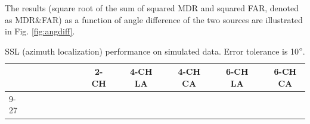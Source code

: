 \documentclass[lettersize,journal]{IEEEtran}
\begin{document}
The results (square root of the sum of squared MDR and squared FAR, denoted as MDR\&FAR) as a function of angle difference of the two sources are illustrated in Fig. \ref{fig:angdiff}.
\begin{table}[]
\renewcommand\arraystretch{1.35}
\scriptsize
{}
\centering
\caption{SSL (azimuth localization) performance on simulated data. Error tolerance is 10$\degree$.}
\label{tab:comexp}
\begin{tabular}{lcllclccccccccccccccccccccc}
\toprule \toprule
\multicolumn{2}{l}{}                                                                                         &                                      &  &                                                                             &  &                                                                               &  & \multicolumn{3}{c}{2-CH}                                                                                                                                                &  & \multicolumn{3}{c}{4-CH LA}                                                                                                                                             &  & \multicolumn{3}{c}{4-CH CA}                                                                                                                                             &  & \multicolumn{3}{c}{6-CH LA}                                                                                                                                             &  & \multicolumn{3}{c}{6-CH CA}                                                                                                                                             \\ \cmidrule{9-27}

\end{tabular}
\end{table}
\end{document}
